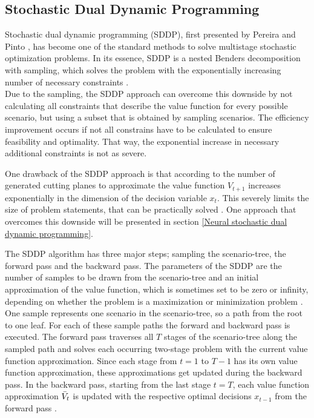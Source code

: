 \subsection{Stochastic Dual Dynamic Programming}\label{Stochastic dual dynamic programming}
Stochastic dual dynamic programming (SDDP), first presented by Pereira and Pinto \cite{PereiraPinto1991}, has become one of the standard methods to solve multistage stochastic optimization problems.
In its essence, SDDP is a nested Benders decomposition with sampling, which solves the problem with the exponentially increasing number of necessary constraints \cite{Fuellner_SDDP_TUT}. \\
Due to the sampling, the SDDP approach can overcome this downside by not calculating all constraints that describe the value function for every possible scenario, but using a subset that is obtained by sampling scenarios.
The efficiency improvement occurs if not all constrains have to be calculated to ensure feasibility and optimality.
That way, the exponential increase in necessary additional constraints is not as severe.

One drawback of the SDDP approach is that according to \cite{NSDDP} the number of generated cutting planes to approximate the value function $V_{t+1}$ increases exponentially in the dimension of the decision variable $x_t$. This severely limits the size of problem statements, that can be practically solved \cite{NSDDP}.
One approach that overcomes this downside will be presented in section \ref{Neural stochastic dual dynamic programming}.

The SDDP algorithm has three major steps; sampling the scenario-tree, the forward pass and the backward pass.
The parameters of the SDDP are the number of samples to be drawn from the scenario-tree and an initial approximation of the value function, which is sometimes set to be zero or infinity, depending on whether the problem is a maximization or minimization problem \cite{Powell_Perspectives_of_ADP}. \\
One sample represents one scenario in the scenario-tree, so a path from the root to one leaf.
For each of these sample paths the forward and backward pass is executed.
The forward pass traverses all $T$ stages of the scenario-tree along the sampled path and solves each occurring two-stage problem with the current value function approximation.
Since each stage from $t=1$ to $T-1$ has its own value function approximation, these approximations get updated during the backward pass.
In the backward pass, starting from the last stage $t=T$, each value function approximation $\Bar{V}_{t}$
is updated with the respective optimal decisions $x_{t-1}$ from the forward pass \cite{NSDDP}.

